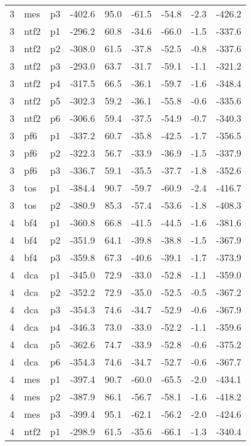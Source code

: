\documentclass[a4paper]{article}
\begin{document}
\begin{table}[ht]
\begin{tabular}{rllrrrrrr}
   3 & mes & p3 & -402.6 & 95.0 & -61.5 & -54.8 & -2.3 & -426.2 \\ 
   3 & ntf2 & p1 & -296.2 & 60.8 & -34.6 & -66.0 & -1.5 & -337.6 \\ 
   3 & ntf2 & p2 & -308.0 & 61.5 & -37.8 & -52.5 & -0.8 & -337.6 \\ 
   3 & ntf2 & p3 & -293.0 & 63.7 & -31.7 & -59.1 & -1.1 & -321.2 \\ 
   3 & ntf2 & p4 & -317.5 & 66.5 & -36.1 & -59.7 & -1.6 & -348.4 \\ 
   3 & ntf2 & p5 & -302.3 & 59.2 & -36.1 & -55.8 & -0.6 & -335.6 \\ 
   3 & ntf2 & p6 & -306.6 & 59.4 & -37.5 & -54.9 & -0.7 & -340.3 \\ 
   3 & pf6 & p1 & -337.2 & 60.7 & -35.8 & -42.5 & -1.7 & -356.5 \\ 
   3 & pf6 & p2 & -322.3 & 56.7 & -33.9 & -36.9 & -1.5 & -337.9 \\ 
   3 & pf6 & p3 & -336.7 & 59.1 & -35.5 & -37.7 & -1.8 & -352.6 \\ 
   3 & tos & p1 & -384.4 & 90.7 & -59.7 & -60.9 & -2.4 & -416.7 \\ 
   3 & tos & p2 & -380.9 & 85.3 & -57.4 & -53.6 & -1.8 & -408.3 \\ 
   4 & bf4 & p1 & -360.8 & 66.8 & -41.5 & -44.5 & -1.6 & -381.6 \\ 
   4 & bf4 & p2 & -351.9 & 64.1 & -39.8 & -38.8 & -1.5 & -367.9 \\ 
   4 & bf4 & p3 & -359.8 & 67.3 & -40.6 & -39.1 & -1.7 & -373.9 \\ 
   4 & dca & p1 & -345.0 & 72.9 & -33.0 & -52.8 & -1.1 & -359.0 \\ 
   4 & dca & p2 & -352.2 & 72.9 & -35.0 & -52.5 & -0.5 & -367.2 \\ 
   4 & dca & p3 & -354.3 & 74.6 & -34.7 & -52.9 & -0.6 & -367.9 \\ 
   4 & dca & p4 & -346.3 & 73.0 & -33.0 & -52.2 & -1.1 & -359.6 \\ 
   4 & dca & p5 & -362.6 & 74.7 & -33.9 & -52.8 & -0.6 & -375.2 \\ 
   4 & dca & p6 & -354.3 & 74.6 & -34.7 & -52.7 & -0.6 & -367.7 \\ 
   4 & mes & p1 & -397.4 & 90.7 & -60.0 & -65.5 & -2.0 & -434.1 \\ 
   4 & mes & p2 & -387.9 & 86.1 & -56.7 & -58.1 & -1.6 & -418.2 \\ 
   4 & mes & p3 & -399.4 & 95.1 & -62.1 & -56.2 & -2.0 & -424.6 \\ 
   4 & ntf2 & p1 & -298.9 & 61.5 & -35.6 & -66.1 & -1.3 & -340.4 \\ 

\end{tabular}
\end{table}
\end{document}
